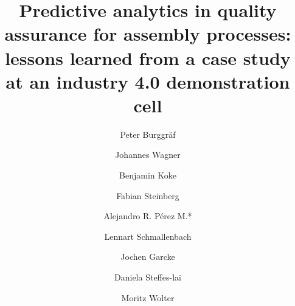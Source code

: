\documentclass[5p,times,procedia]{elsarticle}
\begin{document}
\begin{frontmatter}



%

\title{Predictive analytics in quality assurance for assembly processes:
       lessons learned from a case study at an industry 4.0 demonstration cell}




\author[a]{Peter Burggräf}
\author[a]{Johannes Wagner}
\author[a]{Benjamin Koke}
\author[a]{Fabian Steinberg} 
\author[a]{Alejandro R. Pérez M.*}
\author[a]{Lennart Schmallenbach}
\author[b,c]{Jochen Garcke}
\author[b]{Daniela Steffes-lai}
\author[b,d]{Moritz Wolter}


\address[a]{Chair of International Production Engineering and Management (IPEM), Universität Siegen, Paul-Bonatz-Straße 9-11, Siegen - 57076, Germany}
\address[b]{Fraunhofer Institute for Algorithms and Scientific Computing (SCAI), Schloss Birlinghoven 1, Sankt Augustin- 53757, Germany}
\address[c]{Institut for Numerical Simulation, Universität Bonn, Endenicher Allee 19b, 53115 Bonn}
\address[d]{Institut for Computer Science, Universität Bonn, Endenicher Allee 19a, 53115 Bonn}



\end{frontmatter}
\end{document}
